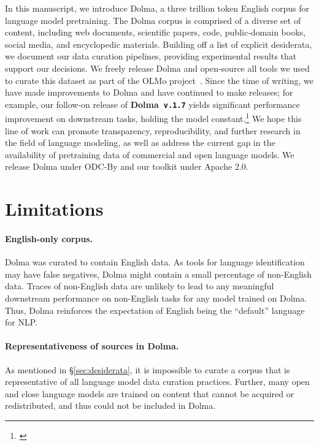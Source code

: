 \documentclass{article}
\newcommand{\dolma}{Dolma\xspace}
\begin{document}
In this manuscript, we introduce \dolma, a three trillion token English corpus for language model pretraining. 
The \dolma corpus is comprised of a diverse set of content, including web documents, scientific papers, code, public-domain books, social media, and encyclopedic materials.
Building off a list of explicit desiderata, we document our data curation pipelines, providing experimental results that support our decisions. 
We freely release \dolma and open-source all tools we used to curate this dataset as part of the OLMo project~\citep{olmo20247b}. 
Since the time of writing, we have made improvements to \dolma and have continued to make releases; for example, our follow-on release of \textbf{\dolma~\texttt{v.1.7}} yields significant performance improvement on downstream tasks, holding the model constant.\footnote{
\href{https://blog.allenai.org/olmo-1-7-7b-a-24-point-improvement-on-mmlu-92b43f7d269d}{}}
We hope this line of work can promote transparency, reproducibility, and further research in the field of language modeling, 
as well as address the current gap in the availability of pretraining data of commercial and open language models.
We release \dolma under ODC-By
and our toolkit under Apache 2.0.

\section*{Limitations}
\label{sec:limitations}

\paragraph{English-only corpus.} 
\dolma was curated to contain English data. 
As tools for language identification may have false negatives, \dolma might contain a small percentage of non-English data.
Traces of non-English data are unlikely to lead to any meaningful downstream performance on non-English tasks for any model trained on \dolma. 
Thus, \dolma reinforces the expectation of English being the ``default'' language for NLP. 

\paragraph{Representativeness of sources in \dolma.} 
As mentioned in \S\ref{sec:desiderata}, it is impossible to curate a corpus that is representative of all language model data curation practices. 
Further, many open and close language models are trained on content that cannot be acquired or redistributed, and thus could not be included in \dolma. 
\end{document}
